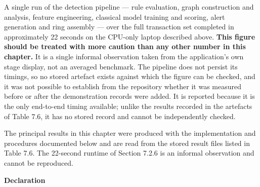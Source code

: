 \documentclass[12pt,a4paper,oneside]{report}
\begin{document}
\noindent A single run of the detection pipeline --- rule evaluation, graph construction and analysis, feature engineering, classical model training and scoring, alert generation and ring assembly --- over the full transaction set completed in approximately 22 seconds on the CPU-only laptop described above. \textbf{This figure should be treated with more caution than any other number in this chapter.} It is a single informal observation taken from the application's own stage display, not an averaged benchmark. The pipeline does not persist its timings, so no stored artefact exists against which the figure can be checked, and it was not possible to establish from the repository whether it was measured before or after the demonstration records were added. It is reported because it is the only end-to-end timing available; unlike the results recorded in the artefacts of Table 7.6, it has no stored record and cannot be independently checked.
\clearpage

\noindent The principal results in this chapter were produced with the implementation and procedures documented below and are read from the stored result files listed in Table 7.6. The 22-second runtime of Section 7.2.6 is an informal observation and cannot be reproduced.
\clearpage
\begin{center}
\vspace*{-0.55cm}\vspace*{-7pt}
{\large\bfseries Declaration\par}
\end{center}
\vspace{17pt}
\end{document}
